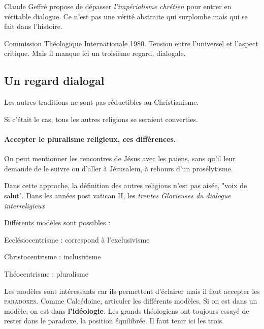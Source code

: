 Claude Geffré  propose de dépasser \textit{l'impérialisme chrétien} pour entrer en véritable dialogue. Ce n'est pas une vérité abstraite qui surplombe mais qui se fait dans l'histoire. 

Commission Théologique Internationale 1980. Tension entre l'universel et l'aspect critique. Mais il manque ici un troisième regard, dialogale.


\subsection{Un regard dialogal}
 
\begin{Synthesis}
Les autres traditions ne sont pas réductibles au Christianisme.
\end{Synthesis}



Si c'était le cas, tous les autres religions se seraient converties.

\paragraph{Accepter le pluralisme religieux, ces différences.} On peut mentionner les rencontres de Jésus avec les paiens, sans qu'il leur demande de le suivre ou d'aller à Jérusalem, à rebours d'un prosélytisme. 

Dans cette approche, la définition des autres religions n'est pas aisée, "voix de salut".
Dans les années post vatican II, les \textit{trentes Glorieuses du dialogue interreligieux}


\begin{Def}
Différents modèles sont possibles : 
\bi
\item  Ecclésiocentrisme : correspond à l'exclusivisme
\item Christocentrisme : inclusivisme
\item Théocentrisme : pluralisme
\ei

\end{Def}

Les modèles sont intéressants car ils permettent d'éclairer mais il faut accepter les \textsc{paradoxes}. Comme Calcédoine, articuler les différents modèles. Si on est dans un modèle, on est dans \textbf{l'idéologie}. Les grands théologiens ont toujours essayé de rester dans le paradoxe, la position équilibrée. Il faut tenir ici les trois.

